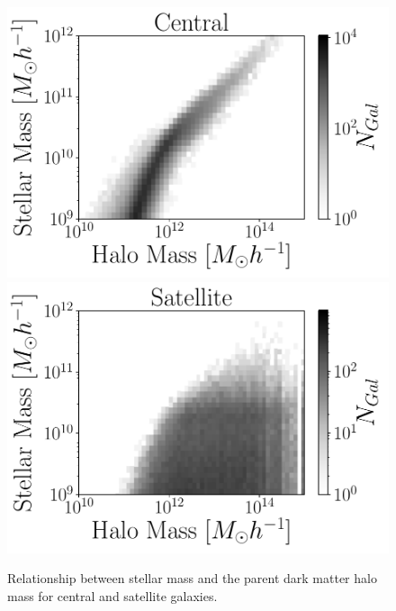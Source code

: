 \documentclass[fleqn,usenatbib]{mnras}
\begin{document}
\begin{figure}
    \centering
     \includegraphics[width=1\columnwidth]{figuras/his2_centrales.pdf}
    \includegraphics[width=1\columnwidth]{figuras/his2_satelite.pdf}
    \caption{Relationship between stellar mass and the parent dark
      matter halo mass for central and satellite galaxies.} 
    \label{fig:stellar_to_halo}
\end{figure}
\end{document}
